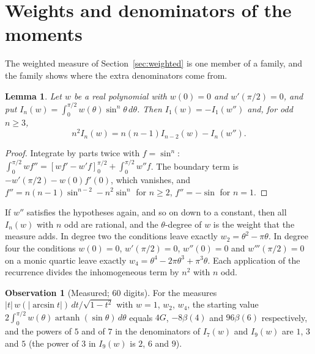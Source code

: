 \documentclass[11pt]{article}
\newtheorem{lemma}[theorem]{Lemma}
\theoremstyle{definition}
\newtheorem{observation}[theorem]{Observation}
\begin{document}
\section{Weights and denominators of the moments}\label{sec:weights}

The weighted measure of Section~\ref{sec:weighted} is one member of a family, and the family shows where the extra denominators come from.

\begin{lemma}\label{lem:weightrec}
Let $w$ be a real polynomial with $w(0)=0$ and $w'(\pi/2)=0$, and put $I_n(w)=\int_0^{\pi/2}w(\theta)\sin^n\theta\,d\theta$. Then $I_1(w)=-I_1(w'')$ and, for odd $n\ge3$,
\[
n^2I_n(w)=n(n-1)I_{n-2}(w)-I_n(w'').
\]
\end{lemma}

\begin{proof}
Integrate by parts twice with $f=\sin^n$: $\int_0^{\pi/2}wf''=[wf'-w'f]_0^{\pi/2}+\int_0^{\pi/2}w''f$. The boundary term is $-w'(\pi/2)-w(0)f'(0)$, which vanishes, and $f''=n(n-1)\sin^{n-2}-n^2\sin^n$ for $n\ge2$, $f''=-\sin$ for $n=1$.
\end{proof}

If $w''$ satisfies the hypotheses again, and so on down to a constant, then all $I_n(w)$ with $n$ odd are rational, and the $\theta$-degree of $w$ is the weight that the measure adds. In degree two the conditions leave exactly $w_2=\theta^2-\pi\theta$. In degree four the conditions $w(0)=0$, $w'(\pi/2)=0$, $w''(0)=0$ and $w'''(\pi/2)=0$ on a monic quartic leave exactly $w_4=\theta^4-2\pi\theta^3+\pi^3\theta$. Each application of the recurrence divides the inhomogeneous term by $n^2$ with $n$ odd.

\begin{observation}[Measured; $60$ digits]\label{obs:weights}
For the measures $|t|\,w(|\arcsin t|)\,dt/\sqrt{1-t^2}$ with $w=1$, $w_2$, $w_4$, the starting value $2\int_0^{\pi/2}w(\theta)\operatorname{artanh}(\sin\theta)\,d\theta$ equals $4G$, $-8\beta(4)$ and $96\beta(6)$ respectively, and the powers of $5$ and of $7$ in the denominators of $I_7(w)$ and $I_9(w)$ are $1$, $3$ and $5$ (the power of $3$ in $I_9(w)$ is $2$, $6$ and $9$).
\end{observation}
\end{document}
